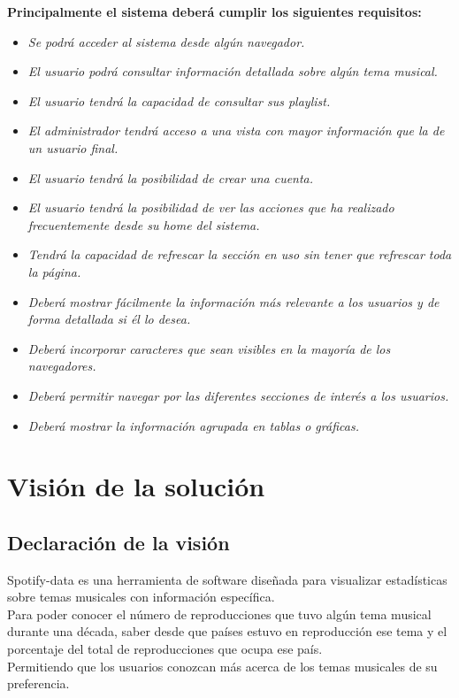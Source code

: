 \documentclass[12pt,a4paper]{book}
\begin{document}
\textbf{Principalmente el sistema deberá cumplir los siguientes requisitos: }
\vspace{0.5 cm}
\begin{itemize}
\item \textit{Se podrá acceder al sistema desde algún navegador.}
\item \textit{El usuario podrá consultar información detallada sobre algún tema musical.}
\item \textit{El usuario tendrá la capacidad de consultar sus playlist.}
\item \textit{El administrador tendrá acceso a una vista con mayor información que la de un usuario final.}
\item \textit{El usuario tendrá la posibilidad de crear una cuenta.}
\item \textit{El usuario tendrá la posibilidad de ver las acciones que ha realizado frecuentemente desde su home del sistema.}
\item \textit{Tendrá la capacidad de refrescar la sección en uso sin tener que refrescar toda la página.}
\item \textit{Deberá mostrar fácilmente la información más relevante a los usuarios y de forma detallada si él lo desea.}
\item \textit{Deberá incorporar caracteres que sean visibles en la mayoría de los navegadores.}
\item \textit{Deberá permitir navegar por las diferentes secciones de interés a los usuarios.}
\item \textit{Deberá mostrar la información agrupada en tablas o gráficas.}
\end{itemize}

\chapter{Visión de la solución}

\section{Declaración de la visión}
\vspace{0.5 cm}
Spotify-data es una herramienta de software diseñada para visualizar estadísticas sobre temas musicales con información específica.\\ 
Para poder conocer el número de reproducciones que tuvo algún tema musical durante una década, saber desde que países estuvo en reproducción ese tema y el porcentaje del total de reproducciones que ocupa ese país.\\ Permitiendo que los usuarios conozcan más acerca de los temas musicales de su preferencia.
\end{document}
